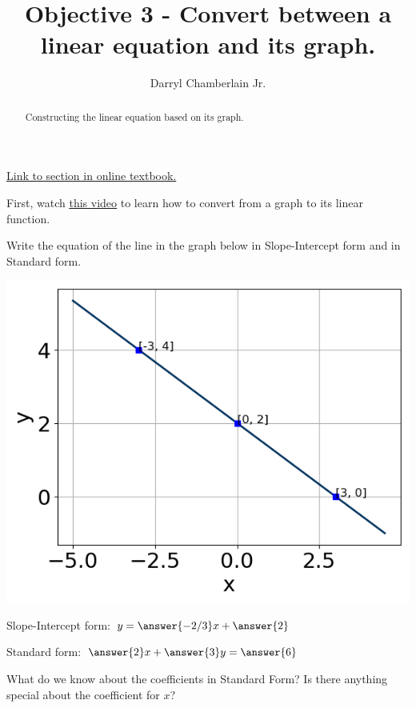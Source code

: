 \documentclass{ximera}
\author{Darryl Chamberlain Jr.}
\title{Objective 3 - Convert between a linear equation and its graph.}
\begin{document}
\begin{abstract}
Constructing the linear equation based on its graph. 
\end{abstract}
\maketitle

\href{https://cnx.org/contents/mwjClAV_@8.1:62_eXnY6@14/Linear-Equations-in-One-Variable}{Link to section in online textbook.}


First, watch \underline{\href{https://mediasite.video.ufl.edu/Mediasite/Play/be61784320d14422820fb6f774fd7b7b1d}{this video}} to learn how to convert from a graph to its linear function. 


\begin{question}
Write the equation of the line in the graph below in Slope-Intercept form and in Standard form. 

\includegraphics[scale=0.5]{question1.png}

Slope-Intercept form: $y = \answer{-2/3}x + \answer{2}$

Standard form: $\answer{2} x + \answer{3} y = \answer{6}$

\begin{hint}
	What do we know about the coefficients in Standard Form? Is there anything special about the coefficient for $x$?
\end{hint}
\end{question}
\end{document}
